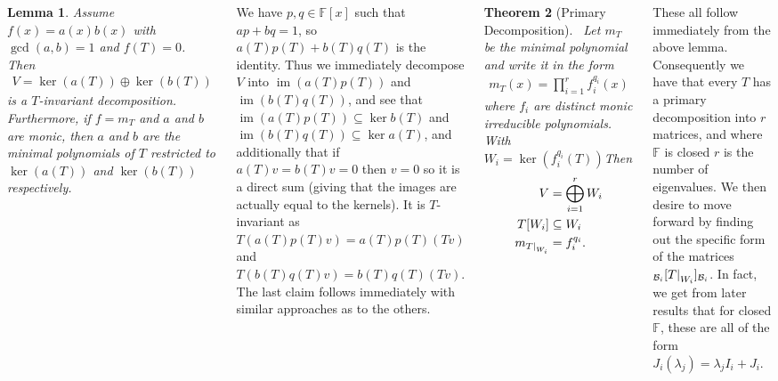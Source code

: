 \documentclass{tikzposter} %
\DeclareMathOperator{\im}{im}
\newcommand\restr[2]{{%
  \left.\kern-\nulldelimiterspace %
  #1 %
  \right|_{#2} %
  }}
\newtheorem{theorem}{Theorem}
\newtheorem{lemma}[theorem]{Lemma}
\begin{document}
\begin{columns}
{   \begin{lemma}
     Assume $f(x) = a(x)b(x)$ with $\gcd(a,b) = 1$ and $f(T) = 0$. Then
     \begin{align*}
       V = \ker(a(T)) \oplus \ker(b(T))
     \end{align*}
     is a $T$-invariant decomposition. Furthermore, if $f = m_{T}$ and $a$ and $b$ are monic, then $a$ and $b$ are the minimal polynomials of $T$ restricted to $\ker(a(T))$ and $\ker(b(T))$ respectively.
   \end{lemma}
   \hphantom{}

   We have $p, q \in \mathbb{F}[x]$ such that $ap+bq = 1$, so $a(T)p(T) + b(T)q(T)$ is the identity. Thus we immediately decompose $V$ into $\im (a(T)p(T))$ and $\im (b(T)q(T))$, and see that $\im (a(T)p(T)) \subseteq \ker b(T)$ and $\im (b(T)q(T)) \subseteq \ker a(T)$, and additionally that if $a(T)v = b(T)v = 0$ then $v = 0$ so it is a direct sum (giving that the images are actually equal to the kernels). It is $T$-invariant as $T(a(T)p(T)v) = a(T)p(T)(Tv)$ and $T(b(T)q(T)v) = b(T)q(T)(Tv)$. The last claim follows immediately with similar approaches as to the others. \\

   \begin{theorem}[Primary Decomposition]
   \ Let $m_{T}$ be the minimal polynomial and write it in the form
     \begin{align*}
       m_{T}(x) = \prod_{i=1}^{r} f_{i}^{q_{i}}(x)
     \end{align*}
     where $f_{i}$ are distinct monic irreducible polynomials. With $W_{i} = \ker(f_{i}^{q_{i}}(T))$Then
     \begin{align*}
       V &= \bigoplus_{i=1}^{r} W_{i} \\
       T[W_{i}] &\subseteq W_{i} \\
       m_{\restr{T}{W_{i}}} &= f_{i}^{q_{i}}.
     \end{align*}
   \end{theorem}

   These all follow immediately from the above lemma. Consequently we have that every $T$ has a primary decomposition into $r$ matrices, and where $\mathbb{F}$ is closed $r$ is the number of eigenvalues. We then desire to move forward by finding out the specific form of the matrices $\phantom{}_{\mathcal{B}_{i}}[\restr{T}{W_{i}}]_{\mathcal{B}_{i}}$. In fact, we get from later results that for closed $\mathbb{F}$, these are all of the form $J_{i}(\lambda_{j}) = \lambda_{j} I_{i} + J_{i}$. \\

}
\end{columns}
\end{document}
